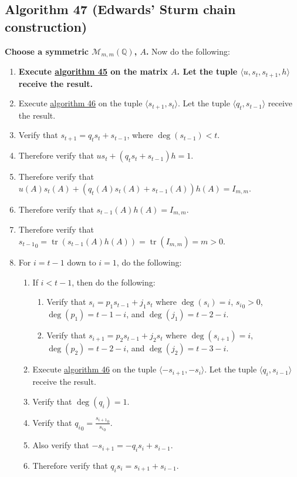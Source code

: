 \documentclass[twocolumn]{article}
\DeclareMathOperator{\tr}{tr}
\begin{document}
		\subsection{Algorithm 47 (Edwards' Sturm chain construction)}\label{sec:algorithm 47}
			\textbf{Choose a symmetric $\mathcal{M}_{m,m}(\mathbb{Q})$, $A$.} Now do the following:
			\begin{enumerate}
				\item \textbf{Execute \hyperref[sec:algorithm 45]{algorithm 45} on the matrix $A$. Let the tuple $\langle u,s_t,s_{t+1},h\rangle$ receive the result.}
				\item Execute \hyperref[sec:algorithm 46]{algorithm 46} on the tuple $\langle s_{t+1},s_t\rangle$. Let the tuple $\langle q_t,s_{t-1}\rangle$ receive the result.
				\item Verify that $s_{t+1}=q_ts_t+s_{t-1}$, where $\deg(s_{t-1})<t$.
				\item Therefore verify that $us_t+(q_ts_t+s_{t-1})h=1$.
				\item Therefore verify that $u(A)s_t(A)+(q_t(A)s_t(A)+s_{t-1}(A))h(A)=I_{m,m}$.
				\item Therefore verify that $s_{t-1}(A)h(A)=I_{m,m}$.
				\item Therefore verify that ${s_{t-1}}_0=\tr(s_{t-1}(A)h(A))=\tr(I_{m,m})=m>0$.
				\item For $i=t-1$ down to $i=1$, do the following:
				\begin{enumerate}
					\item If $i<t-1$, then do the following:
					\begin{enumerate}
						\item Verify that $s_i=p_1s_{t-1}+j_1s_t$ where $\deg(s_i)=i$, ${s_i}_0>0$, $\deg(p_1)=t-1-i$, and $\deg(j_1)=t-2-i$.
						\item Verify that $s_{i+1}=p_2s_{t-1}+j_2s_t$ where $\deg(s_{i+1})=i$, $\deg(p_2)=t-2-i$, and $\deg(j_2)=t-3-i$.
					\end{enumerate}
					\item Execute \hyperref[sec:algorithm 46]{algorithm 46} on the tuple $\langle -s_{i+1},-s_i\rangle$. Let the tuple $\langle q_i,s_{i-1}\rangle$ receive the result.
					\item Verify that $\deg(q_i)=1$.
					\item Verify that ${q_i}_0=\frac{{s_{i+1}}_0}{{s_i}_0}$.
					\item Also verify that $-s_{i+1}=-q_is_i+s_{i-1}$.
					\item Therefore verify that $q_is_i=s_{i+1}+s_{i-1}$.

\end{enumerate}
\end{enumerate}
\end{document}

